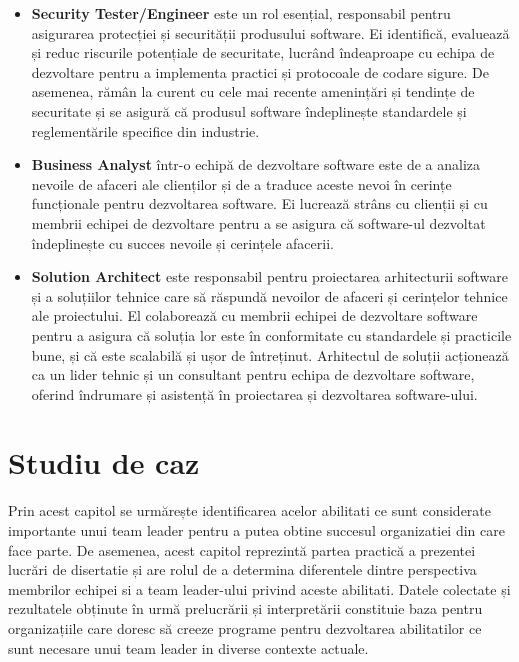 \documentclass[a4paper, 12pt]{article}
\begin{document}
\begin{itemize}
\item \textbf{Security Tester/Engineer} este un rol esențial, responsabil pentru asigurarea protecției și securității produsului software. Ei identifică, evaluează și reduc riscurile potențiale de securitate, lucrând îndeaproape cu echipa de dezvoltare pentru a implementa practici și protocoale de codare sigure. De asemenea, rămân la curent cu cele mai recente amenințări și tendințe de securitate și se asigură că produsul software îndeplinește standardele și reglementările specifice din industrie.

\item \textbf{Business Analyst} într-o echipă de dezvoltare software este de a analiza nevoile de afaceri ale clienților și de a traduce aceste nevoi în cerințe funcționale pentru dezvoltarea software. Ei lucrează strâns cu clienții și cu membrii echipei de dezvoltare pentru a se asigura că software-ul dezvoltat îndeplinește cu succes nevoile și cerințele afacerii.

\item \textbf{ Solution Architect} este responsabil pentru proiectarea arhitecturii software și a soluțiilor tehnice care să răspundă nevoilor de afaceri și cerințelor tehnice ale proiectului. El colaborează cu membrii echipei de dezvoltare software pentru a asigura că soluția lor este în conformitate cu standardele și practicile bune, și că este scalabilă și ușor de întreținut. Arhitectul de soluții acționează ca un lider tehnic și un consultant pentru echipa de dezvoltare software, oferind îndrumare și asistență în proiectarea și dezvoltarea software-ului.


\end{itemize}

\setcounter{section}{2}
	\section{Studiu de caz }

	\quad\quad Prin acest capitol se urmărește identificarea acelor abilitati ce sunt  considerate importante unui team leader pentru a putea obtine succesul organizatiei din care face parte. De asemenea, acest capitol reprezintă partea practică a prezentei lucrări de disertatie și are rolul de a determina diferentele dintre perspectiva membrilor echipei si a team leader-ului privind  aceste abilitati. Datele colectate și rezultatele obținute în urmă prelucrării și interpretării constituie baza pentru organizațiile care doresc să creeze programe pentru dezvoltarea abilitatilor ce sunt necesare unui team leader in diverse contexte actuale.
\end{document}
